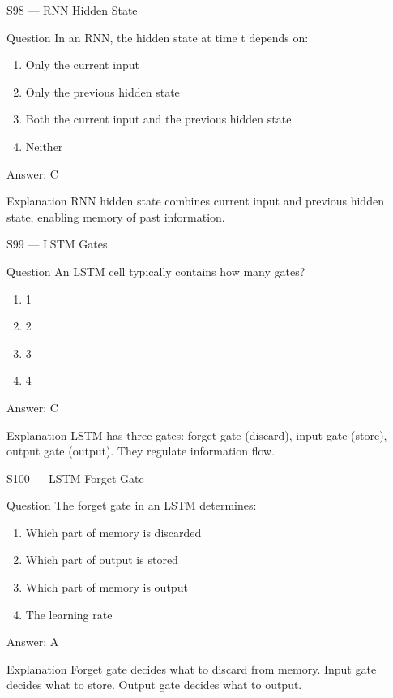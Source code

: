 \documentclass[aspectratio=169,8pt]{beamer}
\begin{document}
	\begin{frame}{S98 --- RNN Hidden State}
		\begin{block}{Question}
			In an RNN, the hidden state at time t depends on:
			\begin{enumerate}
				\item Only the current input
				\item Only the previous hidden state
				\item Both the current input and the previous hidden state
				\item Neither
			\end{enumerate}
		\end{block}
		\begin{exampleblock}{Answer: C}\end{exampleblock}
		\begin{block}{Explanation}
			RNN hidden state combines current input and previous hidden state, enabling memory of past information.
		\end{block}
	\end{frame}
	
	\begin{frame}{S99 --- LSTM Gates}
		\begin{block}{Question}
			An LSTM cell typically contains how many gates?
			\begin{enumerate}
				\item 1
				\item 2
				\item 3
				\item 4
			\end{enumerate}
		\end{block}
		\begin{exampleblock}{Answer: C}\end{exampleblock}
		\begin{block}{Explanation}
			LSTM has three gates: forget gate (discard), input gate (store), output gate (output). They regulate information flow.
		\end{block}
	\end{frame}
	
	\begin{frame}{S100 --- LSTM Forget Gate}
		\begin{block}{Question}
			The forget gate in an LSTM determines:
			\begin{enumerate}
				\item Which part of memory is discarded
				\item Which part of output is stored
				\item Which part of memory is output
				\item The learning rate
			\end{enumerate}
		\end{block}
		\begin{exampleblock}{Answer: A}\end{exampleblock}
		\begin{block}{Explanation}
			Forget gate decides what to discard from memory. Input gate decides what to store. Output gate decides what to output.
		\end{block}
	\end{frame}
	
\end{document}
